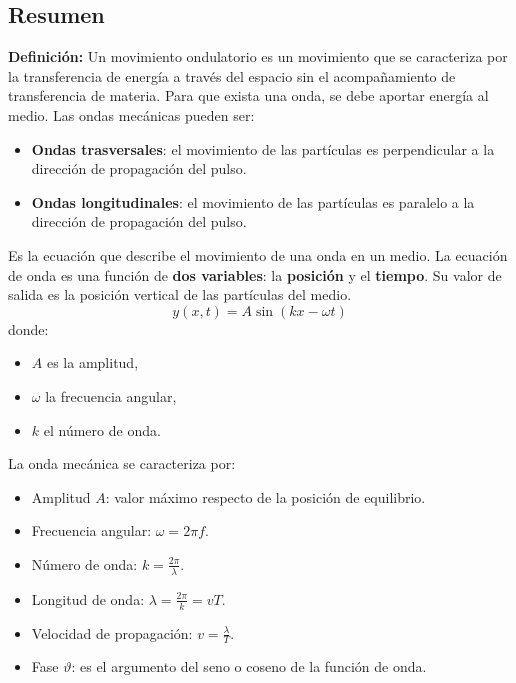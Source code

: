 \subsection{Resumen}

\begin{tcolorbox}[title=Movimiento Ondulatorio]
  \textbf{Definición:} Un movimiento ondulatorio es un movimiento que se caracteriza por la transferencia de energía a través del espacio sin el acompañamiento de transferencia de materia. Para que exista una onda, se debe aportar energía al medio.
  Las ondas mecánicas pueden ser:
  \begin{itemize}
    \item \textbf{Ondas trasversales}: el movimiento de las partículas es perpendicular a la dirección de propagación del pulso.
    \item \textbf{Ondas longitudinales}: el movimiento de las partículas es paralelo a la dirección de propagación del pulso.
  \end{itemize}
\end{tcolorbox}

\begin{tcolorbox}[title=Ecuación de onda]
  Es la ecuación que describe el movimiento de una onda en un medio. La ecuación de onda es una función de \textbf{dos variables}: la \textbf{posición} y el \textbf{tiempo}. Su valor de salida es la posición vertical de las partículas del medio.
  \[
    y(x, t) = A \sin\left( kx - \omega t \right)
  \]
  donde:
  \begin{itemize}
    \item \(A\) es la amplitud,
    \item \(\omega\) la frecuencia angular,
    \item \(k\) el número de onda.
  \end{itemize}
\end{tcolorbox}

\begin{tcolorbox}[title=Elementos característicos]
  La onda mecánica se caracteriza por:
  \begin{itemize}
    \item Amplitud \(A\): valor máximo respecto de la posición de equilibrio.
    \item Frecuencia angular: \(\omega = 2\pi f\).
    \item Número de onda: \(k = \frac{2\pi}{\lambda}\).
    \item Longitud de onda: \(\lambda = \frac{2\pi}{k} = vT\).
    \item Velocidad de propagación: \(v = \frac{\lambda}{T}\).
    \item Fase \(\vartheta\): es el argumento del seno o coseno de la función de onda.
  \end{itemize}
\end{tcolorbox}

